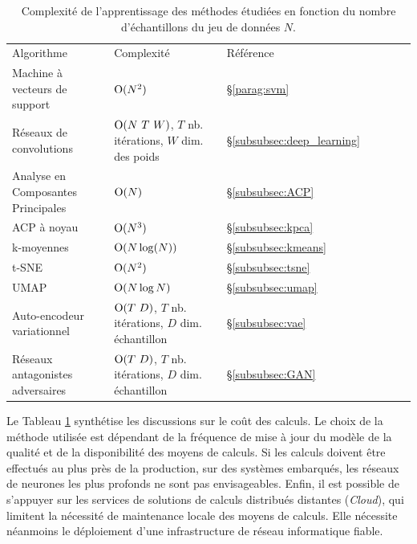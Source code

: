 \begin{table}[tbp]
    \centering
    \begin{tabular}{|l|l|l|l|l|l|l|}
        \arrayrulecolor{black}
        \hhline{---}
        Algorithme  & Complexité & Référence\\
        \hhline{=:=:=:} %
        Machine à vecteurs de support      & $\operatorname{O}(N^2)$        & §\ref{parag:svm} \\ \hline
        Réseaux de convolutions & $\bigO(N \ T \ W)$, $T$ nb. itérations, $W$ dim. des poids & §\ref{subsubsec:deep_learning}\\
        \hhline{=:=:=:} %
        Analyse en Composantes Principales & $\operatorname{O}(N)$          & §\ref{subsubsec:ACP}\\ \hline
        ACP à noyau                        & $\operatorname{O}(N^3)$        & §\ref{subsubsec:kpca}\\
        \hhline{=:=:=:}
        k-moyennes                         & $\operatorname{O}(N \log(N))$  & §\ref{subsubsec:kmeans} \\ \hline
        t-SNE                              & $\operatorname{O}(N^2)$        & §\ref{subsubsec:tsne}\\ \hline
        UMAP                               & $\operatorname{O}(N \log N)$   & §\ref{subsubsec:umap}\\ \hline
        Auto-encodeur variationnel        & $\bigO(T \ D)$, $T$ nb. itérations, $D$ dim. échantillon  & §\ref{subsubsec:vae}\\ \hline
        Réseaux antagonistes adversaires   & $\bigO(T \ D)$, $T$ nb. itérations, $D$ dim. échantillon & §\ref{subsubsec:GAN}\\ \hline
    \end{tabular}
    \caption{Complexité de l'apprentissage des méthodes étudiées en fonction du nombre d'échantillons du jeu de données $N$.}
    \label{tab:overview}
\end{table}

Le Tableau \ref{tab:overview} synthétise les discussions sur le coût des calculs.
Le choix de la méthode utilisée est dépendant de la fréquence de mise à jour du modèle de la qualité et de la disponibilité des moyens de calculs.
Si les calculs doivent être effectués au plus près de la production, sur des systèmes embarqués, les réseaux de neurones les plus profonds ne sont pas envisageables.
Enfin, il est possible de s'appuyer sur les services de solutions de calculs distribués distantes (\textit{Cloud}), qui limitent la nécessité de maintenance locale des moyens de calculs.
Elle nécessite néanmoins le déploiement d'une infrastructure de réseau informatique fiable.

